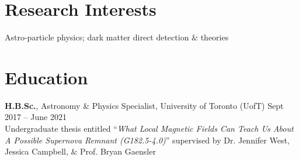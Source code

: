 \documentclass[10pt]{res} %
\begin{document}
\begin{resume}


\section{\Large Research Interests}
\vspace{-5pt} %
\noindent\makebox[\linewidth]{\rule{\textwidth}{0.4pt}}
\vspace{-20pt} %

Astro-particle physics; dark matter direct detection $\&$ theories


\section{\Large Education}
\vspace{-5pt} %
\noindent\makebox[\linewidth]{\rule{\textwidth}{0.4pt}}
\vspace{-20pt} %

{\bf H.B.Sc.}, Astronomy \& Physics Specialist, University of Toronto (UofT) \hfill Sept 2017 -- June 2021 \\ 
Undergraduate thesis entitled ``\textit{What Local Magnetic Fields Can Teach Us About A Possible Supernova Remnant (G182.5-4.0)}'' supervised by Dr. Jennifer West, Jessica Campbell, $\&$ Prof. Bryan Gaensler
 




\end{resume}
\end{document}
